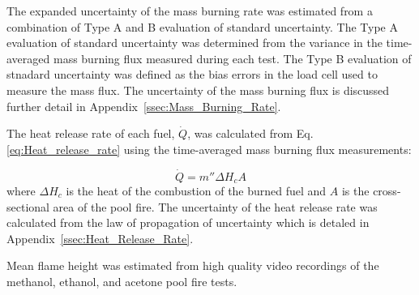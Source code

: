 \documentclass[12pt]{article}
\begin{document}
The expanded uncertainty of the mass burning rate was estimated from a combination of Type A and B evaluation of standard uncertainty. The Type A evaluation of standard uncertainty was determined from the variance in the time-averaged mass burning flux measured during each test. The Type B evaluation of stnadard uncertainty was defined as the bias errors in the load cell used to measure the mass flux. The uncertainty of the mass burning flux is discussed further detail in Appendix~\ref{ssec:Mass_Burning_Rate}.

The heat release rate of each fuel, $\dot{Q}$, was calculated from Eq.\ref{eq:Heat_release_rate} using the time-averaged mass burning flux measurements:

\begin{equation}\label{eq:Heat_release_rate}
\dot{Q}= m''\Delta H_{c}A
\end{equation}
where $\Delta H_{c}$ is the heat of the combustion of the burned fuel and $A$ is the cross-sectional area of the pool fire. The uncertainty of the heat release rate was calculated from the law of propagation of uncertainty which is detaled in Appendix~\ref{ssec:Heat_Release_Rate}.

Mean flame height was estimated from high quality video recordings of the methanol, ethanol, and acetone pool fire tests. 
\end{document}
